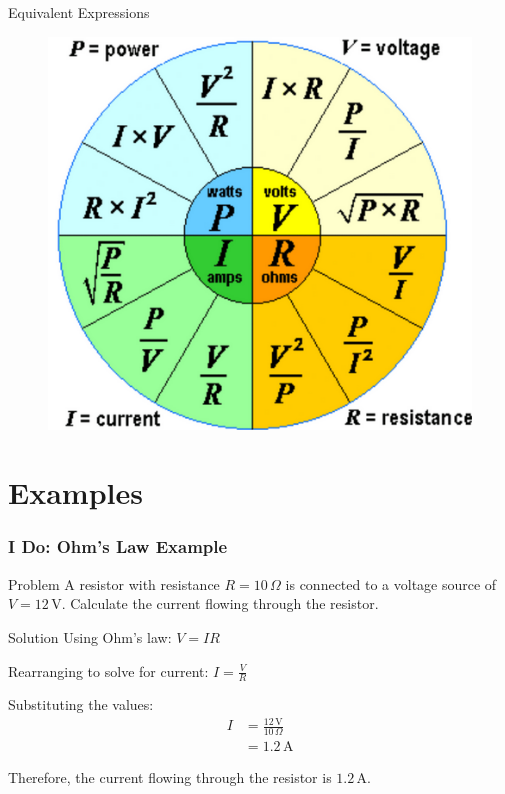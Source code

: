 \documentclass{beamer}
\begin{document}
\begin{frame}
\begin{alertblock}{Equivalent Expressions}
\begin{figure}
    \centering
    \includegraphics[width=0.7\linewidth]{phys11-circuits-ohms-law-power-wheel.png}
\end{figure}
\end{alertblock}
\end{frame}

\section{Examples}

\begin{frame}
\frametitle{I Do: Ohm's Law Example}
\begin{exampleblock}{Problem}
A resistor with resistance $R = 10 \, \Omega$ is connected to a voltage source of $V = 12 \, \text{V}$. Calculate the current flowing through the resistor.
\end{exampleblock}
\pause
\begin{block}{Solution}
Using Ohm's law: $V = IR$

Rearranging to solve for current: $I = \frac{V}{R}$

Substituting the values:
\begin{align}
I &= \frac{12 \, \text{V}}{10 \, \Omega} \\
&= 1.2 \, \text{A}
\end{align}

Therefore, the current flowing through the resistor is $1.2 \, \text{A}$.
\end{block}
\end{frame}
\end{document}
